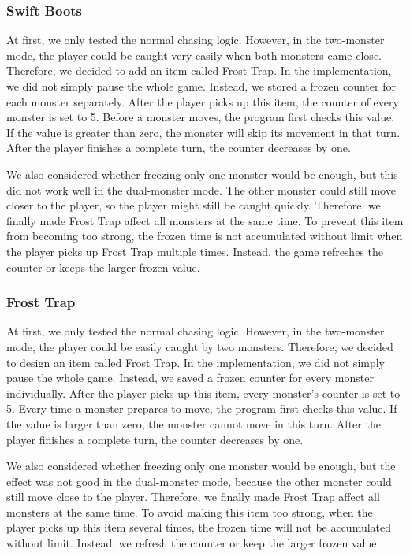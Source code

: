 \documentclass[12pt,a4paper]{article}
\begin{document}
\subsubsection{Swift Boots}

At first, we only tested the normal chasing logic. However, in the two-monster mode, the player could be caught very easily when both monsters came close. Therefore, we decided to add an item called Frost Trap. In the implementation, we did not simply pause the whole game. Instead, we stored a frozen counter for each monster separately. After the player picks up this item, the counter of every monster is set to 5. Before a monster moves, the program first checks this value. If the value is greater than zero, the monster will skip its movement in that turn. After the player finishes a complete turn, the counter decreases by one.



We also considered whether freezing only one monster would be enough, but this did not work well in the dual-monster mode. The other monster could still move closer to the player, so the player might still be caught quickly. Therefore, we finally made Frost Trap affect all monsters at the same time. To prevent this item from becoming too strong, the frozen time is not accumulated without limit when the player picks up Frost Trap multiple times. Instead, the game refreshes the counter or keeps the larger frozen value.
\subsubsection{Frost Trap}
At first, we only tested the normal chasing logic. However, in the two-monster mode, the player could be easily caught by two monsters. Therefore, we decided to design an item called Frost Trap. In the implementation, we did not simply pause the whole game. Instead, we saved a frozen counter for every monster individually. After the player picks up this item, every monster's counter is set to 5. Every time a monster prepares to move, the program first checks this value. If the value is larger than zero, the monster cannot move in this turn. After the player finishes a complete turn, the counter decreases by one.

We also considered whether freezing only one monster would be enough, but the effect was not good in the dual-monster mode, because the other monster could still move close to the player. Therefore, we finally made Frost Trap affect all monsters at the same time. To avoid making this item too strong, when the player picks up this item several times, the frozen time will not be accumulated without limit. Instead, we refresh the counter or keep the larger frozen value.
\end{document}
